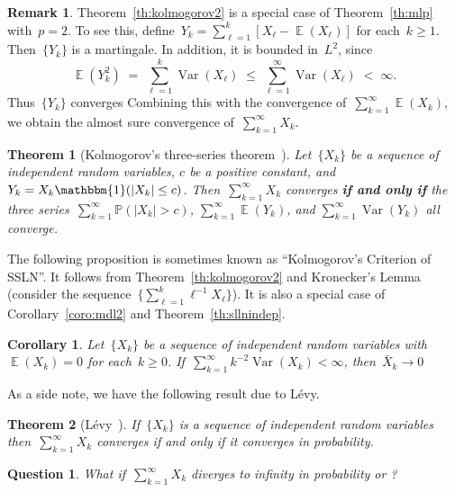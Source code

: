\documentclass[12pt,a4paper]{article}  %
\newcounter{cite}
\newtheorem{theorem}{Theorem}[section]
\newtheorem{corollary}{Corollary}[section]
\newtheorem{question}{Question}[section]
\theoremstyle{definition}
\newtheorem{remark}{Remark}[section]
\numberwithin{equation}{section}
\newcommand{\ind}{\mathbbm{1}}
\newcommand{\as}{{\text{a.s.}}\xspace}
\DeclareMathOperator{\var}{Var}
\DeclareMathOperator{\expc}{\mathbb{E}}
\renewcommand{\Pr}{\mathbb{P}}
\begin{document}
\begin{remark}
    \label{rem:kolmogorov2}
    Theorem~\ref{th:kolmogorov2} is a special case of Theorem~\ref{th:mlp} with~$p=2$.
    To see this, define~$Y_k = \sum_{\ell=1}^k [X_\ell-\expc(X_\ell)]$ for each~$k\ge 1$. Then~$\{Y_k\}$ is a
    martingale. In addition, it is bounded in~$L^2$, since
    \[
        \expc(Y_k^2) \;=\; \sum_{\ell=1}^k \var(X_\ell)
        \;\le\; \sum_{\ell=1}^\infty \var(X_\ell) \;<\; \infty.
    \]
    Thus~$\{Y_k\}$ converges \as Combining this with the convergence of~$\sum_{k=1}^\infty \expc(X_k)$,
    we obtain the almost sure convergence of~$\sum_{k=1}^\infty X_k$.
\end{remark}

\begin{theorem}[Kolmogorov's three-series theorem~\mbox{\cite[Theorems~2.5.8]{Durrett_2019}}]
    \label{th:kolmogorov3}
    Let~$\{X_k\}$ be a sequence of independent random variables, $c$ be a positive constant,
    and~$Y_k = X_k\ind(|X_k| \le c)$. Then~$\sum_{k=1}^\infty X_k$ converges \as \textbf{if and
    only if} the three series~$\sum_{k=1}^\infty \Pr(|X_k| > c)$, $\sum_{k=1}^\infty \expc(Y_k)$, and
    $\sum_{k=1}^\infty \var(Y_k)$ all converge.
\end{theorem}

The following proposition is sometimes known as ``Kolmogorov's Criterion of SSLN''.
It follows from Theorem~\ref{th:kolmogorov2} and Kronecker's Lemma
(consider the sequence~$\{\sum_{\ell=1}^k\ell^{-1}X_\ell\}$).
It is also a special case of Corollary~\ref{coro:mdl2} and Theorem~\ref{th:sllnindep}.

\begin{corollary}
    \label{coro:kolmogorov2}
    Let~$\{X_k\}$ be a sequence of independent random variables with~$\expc(X_k)=0$ for each~$k\ge 0$.
    If~$\sum_{k=1}^\infty k^{-2}\var(X_k) < \infty$, then~$\bar{X}_k\to 0$ \as
\end{corollary}

As a side note, we have the following result due to L\'evy.

\begin{theorem}[L\'evy~\mbox{\cite[Theorem 5.3.4]{Chung_2001}}]
    \label{th:levy}
    If~$\{X_k\}$ is a sequence of independent random variables
    then~$\sum_{k=1}^\infty X_k$ converges \as if and only if it converges in probability.
\end{theorem}

\begin{question}
    What if~$\sum_{k=1}^\infty X_k$ diverges to infinity in probability or \as?
\end{question}
\end{document}
